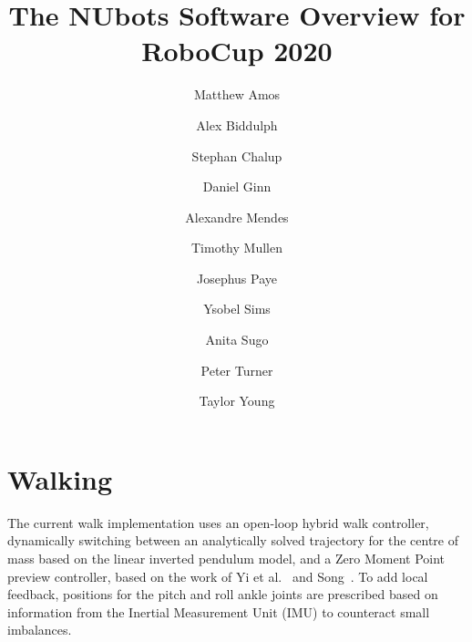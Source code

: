 \documentclass{llncs}
\begin{document}
%

\frontmatter          %
%
\pagestyle{headings}  %
%
%
\mainmatter              %
%
\title{The NUbots Software Overview for RoboCup 2020}
%

\author{Matthew Amos
        \and Alex Biddulph
        \and Stephan Chalup
        \and Daniel Ginn
		\and Alexandre Mendes
        \and Timothy Mullen
        \and Josephus Paye
        \and Ysobel Sims
        \and Anita Sugo
        \and Peter Turner
        \and Taylor Young
        }
       
%
%

%
%

\maketitle              %

\section{Walking}


\medskip

The current walk implementation uses an open-loop hybrid walk controller, dynamically switching between an analytically solved trajectory for the centre of mass based on the linear inverted pendulum model, and a Zero Moment Point preview controller, based on the work of Yi et al.~\cite{SeungJoon2013} and Song~\cite{Song2010DevelopmentOA}. To add local feedback, positions for the pitch and roll ankle joints are prescribed based on information from the Inertial Measurement Unit (IMU) to counteract small imbalances. 
\end{document}
